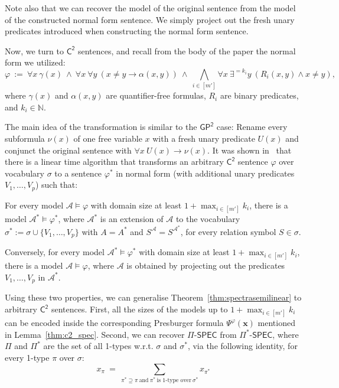 \documentclass[10pt,a4paper]{article}
\theoremstyle{definition}
\theoremstyle{remark}
\newcommand{\cA}{\mathcal{A}}
\newcommand{\bbN}{\mathbb{N}}
\newcommand{\bfx}{\mathbf{x}}
\newcommand{\vocab}{\sigma}
\newcommand{\Ctwo}    {\mathsf{C^2}}
\newcommand{\GPtwo}   {\mathsf{GP^2}}
\newcommand{\intsinterval}[1]{{\left[ #1 \right]}}
\newcommand{\pispec} {\Pi\text{-}\mathsf{SPEC}}
\begin{document}
Note also that we can recover the model of the original sentence from the model of the constructed normal form sentence.
We simply project out the fresh unary predicates introduced when constructing the normal form sentence. 

Now, we turn to $\Ctwo$ sentences, and recall from the body of the paper the normal form we utilized:
\begin{equation*}
    \varphi\ :=\ 
    \forall x\ \gamma(x)\ \land\ 
    \forall x\ \forall y\ \left(x \neq y \to \alpha(x, y)\right)\ \land\ 
    \bigwedge_{i \in \intsinterval{m'}} \forall x\ \exists^{=k_i} y\ \left(R_i(x,y) \land x \neq y\right),
\end{equation*}
where $\gamma(x)$ and $\alpha(x, y)$ are quantifier-free formulas,
$R_i$ are binary predicates,
and $k_i \in \bbN$.
 
The main idea of the transformation is similar to the $\GPtwo$ case:
Rename every subformula $\nu(x)$ of one free variable $x$ with a fresh unary predicate $U(x)$ and conjunct the original sentence with $\forall x\  U(x)\to \nu(x)$.
It was shown in~\cite{ctwocomplexity,ianrevisited} that there is a linear time algorithm that transforms
an arbitrary $\Ctwo$ sentence $\varphi$ over vocabulary $\vocab$ to a sentence $\varphi^*$ in normal form (with additional unary predicates $V_1,\ldots,V_p$) such that:
\begin{compactitem}
\item 
For every model $\cA\models \varphi$ with domain size at least $1+\max_{i\in[m']}k_i$,
there is a model $\cA^*\models \varphi^*$, where $\cA^*$ is an extension of $\cA$ to the vocabulary $\vocab^*:=\vocab\cup\{V_1,\ldots,V_p\}$ with
$A=A^*$ and $S^{\cA}=S^{\cA^*}$, for every relation symbol $S\in\vocab$.
\item
Conversely,
for every model $\cA^*\models \varphi^*$ with domain size at least $1+\max_{i\in[m']}k_i$,
there is a model $\cA\models \varphi$, where $\cA$ is obtained by projecting out the predicates $V_1,\ldots,V_p$ in $\cA^*$.
\end{compactitem}
Using these two properties, we can generalise Theorem~\ref{thm:spectrasemilinear} to arbitrary $\Ctwo$ sentences.
First, all the sizes of the models up to 
$1+\max_{i\in [m']} k_i$ can be encoded inside the corresponding Presburger formula $\Psi^\varphi(\bfx)$
mentioned in Lemma~\ref{thm:c2_spec}.
Second, we can recover $\pispec$ from $\Pi^*\textsf{-SPEC}$,
where $\Pi$ and $\Pi^*$ are the set of all 1-types w.r.t. $\vocab$ and $\vocab^*$,
via the following identity, for every 1-type $\pi$ over $\vocab$:
$$
x_{\pi} \ = \
\sum_{\pi^*\supseteq \pi \ \text{and}\ \pi^*\ \text{is 1-type over}\ \vocab^*} x_{\pi^*}
$$
\end{document}
